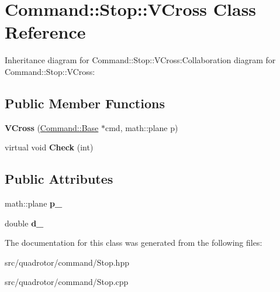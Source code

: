 \hypertarget{classCommand_1_1Stop_1_1VCross}{
\section{Command::Stop::VCross Class Reference}
\label{classCommand_1_1Stop_1_1VCross}
}
Inheritance diagram for Command::Stop::VCross:Collaboration diagram for Command::Stop::VCross:\subsection*{Public Member Functions}
\begin{DoxyCompactItemize}
\item 
\hypertarget{classCommand_1_1Stop_1_1VCross_af8efe94d12d562f53dd32819947b7e16}{
{\bfseries VCross} (\hyperlink{classCommand_1_1Base}{Command::Base} $\ast$cmd, math::plane p)}
\label{classCommand_1_1Stop_1_1VCross_af8efe94d12d562f53dd32819947b7e16}

\item 
\hypertarget{classCommand_1_1Stop_1_1VCross_a973ed85dc311fa2df5d83a78ca8f2b54}{
virtual void {\bfseries Check} (int)}
\label{classCommand_1_1Stop_1_1VCross_a973ed85dc311fa2df5d83a78ca8f2b54}

\end{DoxyCompactItemize}
\subsection*{Public Attributes}
\begin{DoxyCompactItemize}
\item 
\hypertarget{classCommand_1_1Stop_1_1VCross_a910e3731fbe92e4e2faaed5d3488ac9f}{
math::plane {\bfseries p\_\-}}
\label{classCommand_1_1Stop_1_1VCross_a910e3731fbe92e4e2faaed5d3488ac9f}

\item 
\hypertarget{classCommand_1_1Stop_1_1VCross_aa1d7a2990ffcb30d6f4204c4a76959a1}{
double {\bfseries d\_\-}}
\label{classCommand_1_1Stop_1_1VCross_aa1d7a2990ffcb30d6f4204c4a76959a1}

\end{DoxyCompactItemize}


The documentation for this class was generated from the following files:\begin{DoxyCompactItemize}
\item 
src/quadrotor/command/Stop.hpp\item 
src/quadrotor/command/Stop.cpp\end{DoxyCompactItemize}
